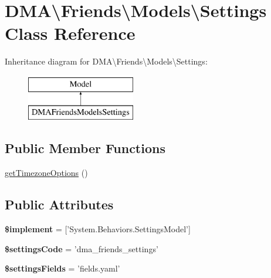 \hypertarget{classDMA_1_1Friends_1_1Models_1_1Settings}{\section{D\+M\+A\textbackslash{}Friends\textbackslash{}Models\textbackslash{}Settings Class Reference}
\label{classDMA_1_1Friends_1_1Models_1_1Settings}
}
Inheritance diagram for D\+M\+A\textbackslash{}Friends\textbackslash{}Models\textbackslash{}Settings\+:\begin{figure}[H]
\begin{center}
\leavevmode
\includegraphics[height=2.000000cm]{d1/d8a/classDMA_1_1Friends_1_1Models_1_1Settings}
\end{center}
\end{figure}
\subsection*{Public Member Functions}
\begin{DoxyCompactItemize}
\item 
\hyperlink{classDMA_1_1Friends_1_1Models_1_1Settings_a347eae65e8aeb114767d5e4fc8542fea}{get\+Timezone\+Options} ()
\end{DoxyCompactItemize}
\subsection*{Public Attributes}
\begin{DoxyCompactItemize}
\item 
\hypertarget{classDMA_1_1Friends_1_1Models_1_1Settings_a22513833a79c36e7a2d180e6b34e48d7}{{\bfseries \$implement} = \mbox{[}'System.\+Behaviors.\+Settings\+Model'\mbox{]}}\label{classDMA_1_1Friends_1_1Models_1_1Settings_a22513833a79c36e7a2d180e6b34e48d7}

\item 
\hypertarget{classDMA_1_1Friends_1_1Models_1_1Settings_a8cd76479c7b825b039fecd635c250f03}{{\bfseries \$settings\+Code} = 'dma\+\_\+friends\+\_\+settings'}\label{classDMA_1_1Friends_1_1Models_1_1Settings_a8cd76479c7b825b039fecd635c250f03}

\item 
\hypertarget{classDMA_1_1Friends_1_1Models_1_1Settings_a72c7148fc3dfb951eaffa85b210fcafd}{{\bfseries \$settings\+Fields} = 'fields.\+yaml'}\label{classDMA_1_1Friends_1_1Models_1_1Settings_a72c7148fc3dfb951eaffa85b210fcafd}

\end{DoxyCompactItemize}


